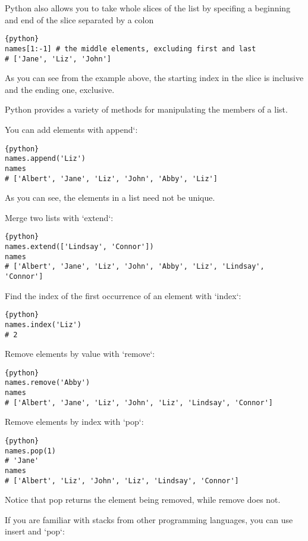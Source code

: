 Python also allows you to take whole slices of the list by specifing a
beginning and end of the slice separated by a colon


\begin{lstlisting}{python}
names[1:-1] # the middle elements, excluding first and last
# ['Jane', 'Liz', 'John']
\end{lstlisting}

As you can see from the example above, the starting index in the slice
is inclusive and the ending one, exclusive.

Python provides a variety of methods for manipulating the members of a
list.

You can add elements with append`:

\begin{lstlisting}{python}
names.append('Liz')
names
# ['Albert', 'Jane', 'Liz', 'John', 'Abby', 'Liz']
\end{lstlisting}

As you can see, the elements in a list need not be unique.

Merge two lists with `extend`:

\begin{lstlisting}{python}
names.extend(['Lindsay', 'Connor'])
names
# ['Albert', 'Jane', 'Liz', 'John', 'Abby', 'Liz', 'Lindsay', 'Connor']
\end{lstlisting}

Find the index of the first occurrence of an element with `index`:

\begin{lstlisting}{python}
names.index('Liz')
# 2
\end{lstlisting}

Remove elements by value with `remove`:

\begin{lstlisting}{python}
names.remove('Abby')
names
# ['Albert', 'Jane', 'Liz', 'John', 'Liz', 'Lindsay', 'Connor']
\end{lstlisting}

Remove elements by index with `pop`:

\begin{lstlisting}{python}
names.pop(1)
# 'Jane'
names
# ['Albert', 'Liz', 'John', 'Liz', 'Lindsay', 'Connor']
\end{lstlisting}

Notice that pop returns the element being removed, while remove does
not.

If you are familiar with stacks from other programming languages, you
can use insert and `pop`:

